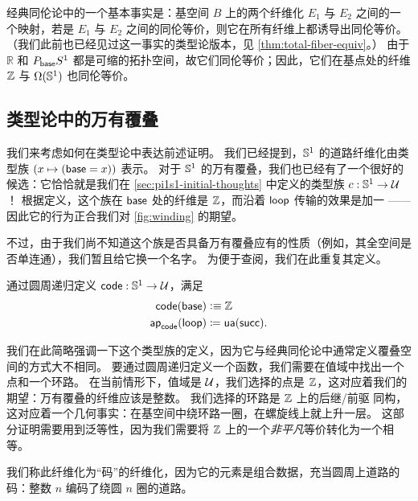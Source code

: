 经典同伦论中的一个基本事实是：基空间 $B$ 上的两个纤维化 $E_1$ 与 $E_2$ 之间的一个映射，若是 $E_1$ 与 $E_2$ 之间的同伦等价，则它在所有纤维上都诱导出同伦等价。
（我们此前也已经见过这一事实的类型论版本，见 \cref{thm:total-fiber-equiv}。）
由于 $\mathbb{R}$ 和 $P_{\mathsf{base}} S^1$ 都是可缩的拓扑空间，故它们同伦等价；因此，它们在基点处的纤维 $\mathbb{Z}$ 与 $\Omega(\mathbb{S} ^1)$ 也同伦等价。

%

\subsection{类型论中的万有覆叠}
\label{sec:pi1s1-universal-cover}

%
%
%

我们来考虑如何在类型论中表达前述证明。
我们已经提到，$\Sn^1$ 的道路纤维化由类型族 $(x\mapsto (\mathsf{base}=x))$ 表示。
对于 $\Sn^1$ 的万有覆叠，我们也已经有了一个很好的候选：它恰恰就是我们在 \cref{sec:pi1s1-initial-thoughts} 中定义的类型族 $c:\mathbb{S}^1\to\mathcal{U}$！
根据定义，这个族在 $\mathsf{base}$ 处的纤维是 $\mathbb{Z}$，而沿着 $\mathsf{loop}$ 传输的效果是加一 —— 因此它的行为正合我们对 \cref{fig:winding} 的期望。

不过，由于我们尚不知道这个族是否具备万有覆叠应有的性质（例如，其全空间是否单连通），我们暂且给它换一个名字。
为便于查阅，我们在此重复其定义。

\begin{defn}[$\Sn^1$ 的万有覆叠] \label{S1-universal-cover}
  通过圆周递归定义 $\mathsf{code} : \mathbb{S} ^1 \to \mathcal{U}$，满足
  \begin{align*}
    \mathsf{code}(\mathsf{base}) &\vcentcolon\equiv \mathbb{Z} \\
    \mathsf{ap}_{\mathsf{code}}({\mathsf{loop}}) &\coloneqq \mathsf{ua}(\mathsf{succ}).
  \end{align*}
\end{defn}

我们在此简略强调一下这个类型族的定义，因为它与经典同伦论中通常定义覆叠空间的方式大不相同。
要通过圆周递归定义一个函数，我们需要在值域中找出一个点和一个环路。
在当前情形下，值域是 $\mathcal{U}$，我们选择的点是 $\mathbb{Z}$，这对应着我们的期望：万有覆叠的纤维应该是整数。
我们选择的环路是 $\mathbb{Z}$ 上的后继/前驱
%
%
同构，这对应着一个几何事实：在基空间中绕环路一圈，在螺旋线上就上升一层。
这部分证明需要用到泛等性，因为我们需要将 $\mathbb{Z}$ 上的一个\emph{非平凡}等价转化为一个相等。

我们称此纤维化为``码''的纤维化，因为它的元素是组合数据，充当圆周上道路的码：整数 $n$ 编码了绕圆 $n$ 圈的道路。

